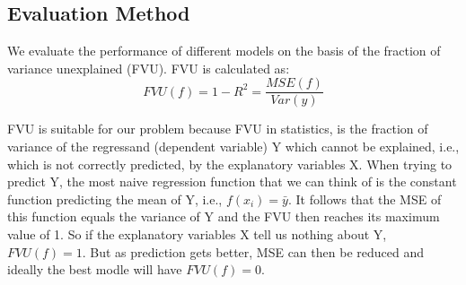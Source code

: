 \subsection{Evaluation Method}
We evaluate the performance of different models on the basis of the fraction of variance unexplained (FVU). FVU is calculated as:
\[FVU(f) =1-R^2 = \frac{MSE(f)}{Var(y)}\]
\par FVU is suitable for our problem because FVU in statistics, is the fraction of variance of the regressand (dependent variable) Y which cannot be explained, i.e., which is not correctly predicted, by the explanatory variables X. When trying to predict Y, the most naive regression function that we can think of is the constant function predicting the mean of Y, i.e., $f(x_{i})=\bar{y}$. It follows that the MSE of this function equals the variance of Y and the FVU then reaches its maximum value of 1. So if the explanatory variables X tell us nothing about Y, $FVU(f)=1$. But as prediction gets better, MSE can then be reduced and ideally the best modle will have $FVU(f) = 0$. 

